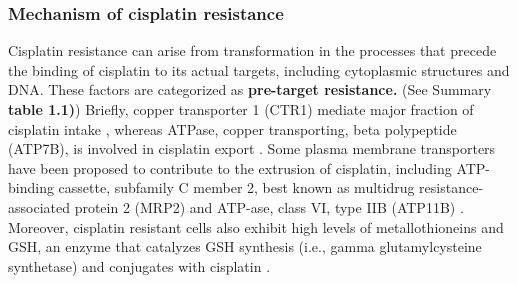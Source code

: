 \subsubsection{Mechanism of cisplatin resistance}
Cisplatin resistance can arise from transformation in the processes that precede the binding of cisplatin to its actual targets, including cytoplasmic structures and DNA. These factors are categorized as \textbf{pre-target resistance.} (See Summary \textbf{table 1.1)}) Briefly, copper transporter 1 (CTR1) mediate major fraction of cisplatin intake \cite{more2010role,ishida2010enhancing, holzer2006contribution}, whereas ATPase, copper transporting, beta polypeptide (ATP7B), is involved in cisplatin export \cite{katano2002acquisition,komatsu2000copper, aida2005expression}. Some plasma membrane transporters have been proposed to contribute to the extrusion of cisplatin, including ATP-binding cassette, subfamily C member 2, best known as multidrug  resistance-associated protein 2 (MRP2) \cite {cui1999drug,korita2010multidrug,liedert2003overexpression} and ATP-ase, class VI, type IIB (ATP11B) \cite{moreno2013atp11b}. Moreover, cisplatin resistant cells also exhibit high levels of metallothioneins \cite{kelley1988overexpression,kasahara1991metallothionein} and GSH, an enzyme that catalyzes GSH synthesis (i.e., gamma glutamylcysteine synthetase) and conjugates with cisplatin \cite{lewis1988glutathione,chen2010role}. 


